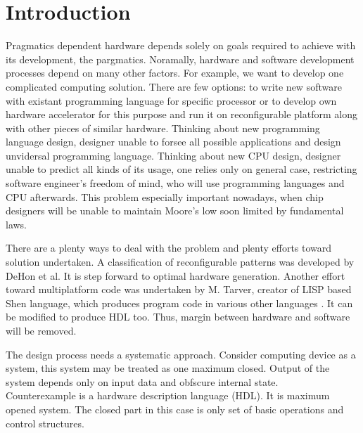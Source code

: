 \section{Introduction}
Pragmatics dependent hardware depends solely on goals required to achieve with its development, the pargmatics. Noramally, hardware and software development processes depend on many other factors. For example, we want to develop one complicated computing solution. There are few options: to write new software with existant programming language for specific processor or to develop own hardware accelerator for this purpose and run it on reconfigurable platform along with other pieces of similar hardware. Thinking about new programming language design, designer unable to forsee all possible applications and design unvidersal programming language. Thinking about new CPU design, designer unable to predict all kinds of its usage, one relies only on general case, restricting software engineer's freedom of mind, who will use programming languages and CPU afterwards. This problem especially important nowadays, when chip designers will be unable to maintain Moore's low soon \cite{mooremaxwell} limited by fundamental laws.

There are a plenty ways to deal with the problem and plenty efforts toward solution undertaken. A classification of reconfigurable patterns was developed by DeHon et al. \cite{reconfigurable_patterns} It is step forward to optimal hardware generation. Another effort toward multiplatform code was undertaken by M. Tarver, creator of LISP based Shen language, which produces program code in various other languages \cite{tarver2013book}. It can be modified to produce HDL too. Thus, margin between hardware and software will be removed.

The design process needs a systematic approach. Consider computing device as a system, this system may be treated as one maximum closed. Output of the system depends only on input data and obfscure internal state.\\
Counterexample is a hardware description language (HDL). It is maximum opened system. The closed part in this case is only set of basic operations and control structures.

